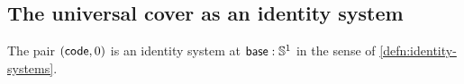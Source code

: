 \documentclass[hott-all.tex]{subfiles}
\begin{document}
\subsection{The universal cover as an identity system}
% 
% 
\begin{thm}
  The pair $(\mathsf{code},0)$ is an identity system at $\mathsf{base}:\mathbb{S}^1$ in the sense of \cref{defn:identity-systems}.
\end{thm}
% 
\end{document}
